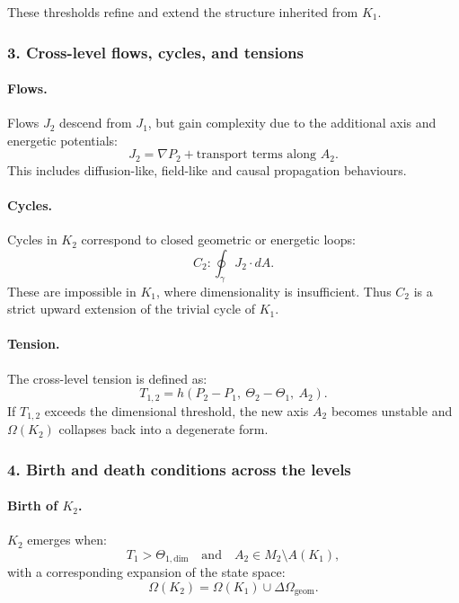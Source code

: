 These thresholds refine and extend the structure inherited from $K_1$.

\subsubsection{3. Cross-level flows, cycles, and tensions}

\paragraph{Flows.}
Flows $J_2$ descend from $J_1$, but gain complexity due to the additional
axis and energetic potentials:
\[
J_2 = \nabla P_2 + \text{transport terms along } A_2.
\]
This includes diffusion-like, field-like and causal propagation behaviours.

\paragraph{Cycles.}
Cycles in $K_2$ correspond to closed geometric or energetic loops:
\[
C_2 : \oint_{\gamma} J_2 \cdot dA.
\]
These are impossible in $K_1$, where dimensionality is insufficient.
Thus $C_2$ is a strict upward extension of the trivial cycle of $K_1$.

\paragraph{Tension.}
The cross-level tension is defined as:
\[
T_{1,2} = h(P_2 - P_1,\ \Theta_2 - \Theta_1,\ A_2).
\]
If $T_{1,2}$ exceeds the dimensional threshold, the new axis $A_2$ becomes
unstable and $\Omega(K_2)$ collapses back into a degenerate form.

\subsubsection{4. Birth and death conditions across the levels}

\paragraph{Birth of \texorpdfstring{$K_2$}{K_2}.}
$K_2$ emerges when:
\[
T_1 > \Theta_{1,\mathrm{dim}}
\quad \text{and} \quad
A_2 \in M_2 \setminus A(K_1),
\]
with a corresponding expansion of the state space:
\[
\Omega(K_2) = \Omega(K_1) \cup \Delta\Omega_{\mathrm{geom}}.
\]

